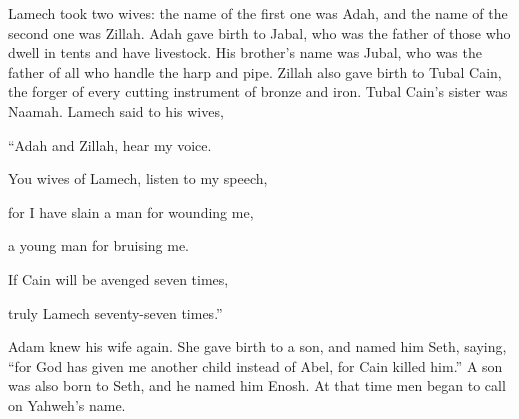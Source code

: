 {Lamech took two wives: the name of the first one was Adah, and the name of the second one was Zillah.
Adah gave birth to Jabal, who was the father of those who dwell in tents and have livestock.
His brother’s name was Jubal, who was the father of all who handle the harp and pipe.
Zillah also gave birth to Tubal Cain, the forger of every cutting instrument of bronze and iron. Tubal Cain’s sister was Naamah.
Lamech said to his wives,
\par }{\Q “Adah and Zillah, hear my voice.
\par }{\QB You wives of Lamech, listen to my speech,
\par }{\Q for I have slain a man for wounding me,
\par }{\QB a young man for bruising me.
\par }{\Q {}If Cain will be avenged seven times,
\par }{\QB truly Lamech seventy-seven times.”
\par }{\PP {}Adam knew his wife again. She gave birth to a son, and named him Seth, saying, “for God has given me another child instead of Abel, for Cain killed him.”
A son was also born to Seth, and he named him Enosh. At that time men began to call on Yahweh’s name.

}

